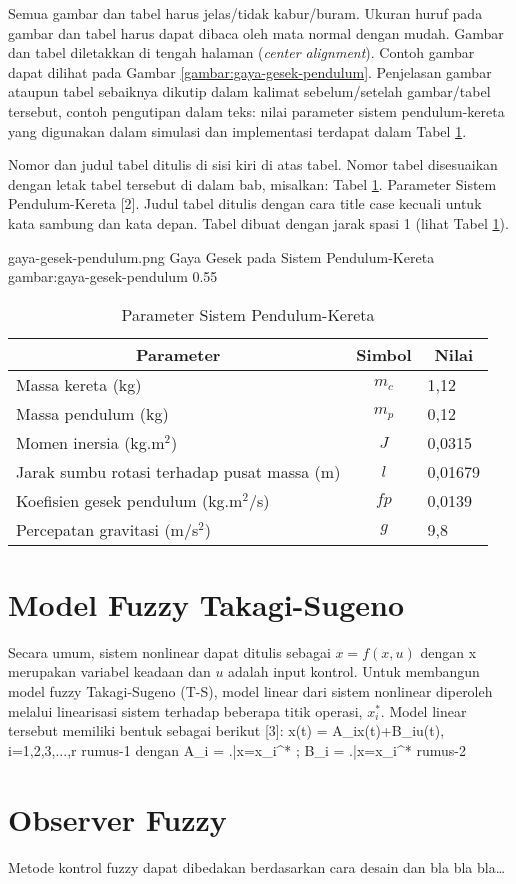 Semua gambar dan tabel harus jelas/tidak kabur/buram. Ukuran huruf pada gambar dan tabel harus dapat dibaca oleh mata normal dengan mudah. Gambar dan tabel diletakkan di tengah halaman (\emph{center alignment}). Contoh gambar dapat dilihat pada Gambar \ref{gambar:gaya-gesek-pendulum}. Penjelasan gambar ataupun tabel sebaiknya dikutip dalam kalimat sebelum/setelah gambar/tabel tersebut, contoh pengutipan dalam teks: nilai parameter sistem pendulum-kereta yang digunakan dalam simulasi dan implementasi terdapat dalam Tabel \ref{tabel:pendulum}.

Nomor dan judul tabel ditulis di sisi kiri di atas tabel. Nomor tabel disesuaikan dengan letak tabel tersebut di dalam bab, misalkan: Tabel \ref{tabel:pendulum}. Parameter Sistem Pendulum-Kereta [2]. Judul tabel ditulis dengan cara title case kecuali untuk kata sambung dan kata depan. Tabel dibuat dengan jarak spasi 1 (lihat Tabel \ref{tabel:pendulum}).

\gambar
    {gaya-gesek-pendulum.png}
    {Gaya Gesek pada Sistem Pendulum-Kereta}
    {gambar:gaya-gesek-pendulum}
    {0.55}
   
\begin{table}[H]
    \caption{Parameter Sistem Pendulum-Kereta}
    \centering
    \begin{tabular}{ lcl } 
        \toprule
        \multicolumn{1}{c}{\textbf{Parameter}} & \multicolumn{1}{c}{\textbf{Simbol}} & \multicolumn{1}{c}{\textbf{Nilai}} \\
        \midrule
        Massa kereta (kg) & $m_c$ & 1,12 \\
        Massa pendulum (kg) & $m_p$ & 0,12 \\
        Momen inersia (kg.m$^2$) & $J$ & 0,0315 \\
        Jarak sumbu rotasi terhadap pusat massa (m) & $l$ & 0,01679 \\
        Koefisien gesek pendulum (kg.m$^2$/s) & $fp$ & 0,0139 \\
        Percepatan gravitasi (m/s$^2$) & $g$ & 9,8 \\
        \bottomrule
    \end{tabular}
    \label{tabel:pendulum}
\end{table}

\section{Model Fuzzy Takagi-Sugeno}

Secara umum, sistem nonlinear dapat ditulis sebagai $x = f(x,u)$  dengan x merupakan variabel keadaan dan $u$ adalah input kontrol. Untuk membangun model fuzzy Takagi-Sugeno (T-S), model linear dari sistem nonlinear diperoleh melalui linearisasi sistem terhadap beberapa titik operasi, $x_i^*$. Model linear tersebut memiliki bentuk sebagai berikut [3]:
\rumus
    {x(t) = A_ix(t)+B_iu(t), i=1,2,3,...,r}
    {rumus-1}
\noindent dengan
\rumus
    {A_i = \left.\right|x=x_i^* ; B_i = \left.\right|x=x_i^*}
    {rumus-2}

\section{Observer Fuzzy}

Metode kontrol fuzzy dapat dibedakan berdasarkan cara desain dan bla bla bla…